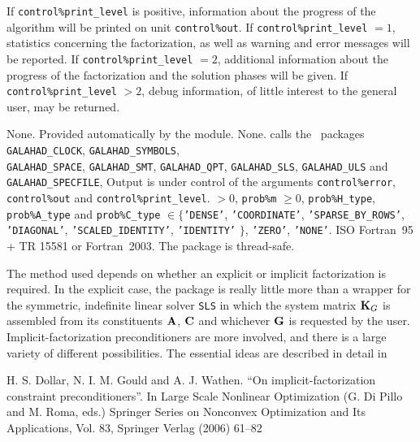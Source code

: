 \documentclass{galahad}
\newcommand{\packagename}{SBLS}
\begin{document}

\galinfo
If {\tt control\%print\_level} is positive, information about the progress
of the algorithm will be printed on unit {\tt control\-\%out}.
If {\tt control\%print\_level} $= 1$, statistics concerning the factorization,
as well as warning and error messages will be reported.
If {\tt control\%print\_level} $= 2$, additional information about the
progress of the factorization and the solution phases will be given.
If {\tt control\%print\_level} $> 2$, debug information, of little
interest to the general user, may be returned.


\galgeneral

\galcommon None.
\galworkspace Provided automatically by the module.
\galroutines None.
\galmodules {\tt \packagename\_solve} calls the \galahad\ packages
{\tt GALAHAD\_CLOCK},
{\tt GALAHAD\_SY\-M\-BOLS}, \\
{\tt GALAHAD\-\_SPACE},
{\tt GALAHAD\_SMT},
{\tt GALAHAD\_QPT},
{\tt GALAHAD\_SLS},
{\tt GALAHAD\_ULS} and
{\tt GALAHAD\_SPECFILE},
\galio Output is under control of the arguments
 {\tt control\%error}, {\tt control\%out} and {\tt control\%print\_level}.
 $> 0$, {\tt prob\%m} $\geq  0$,
{\tt prob\%H\_type}, {\tt prob\%A\_type}
and {\tt prob\%C\_type} $\in \{${\tt 'DENSE'},
 {\tt 'COORDINATE'}, {\tt 'SPARSE\_BY\_ROWS'}, {\tt 'DIAGONAL'},
 {\tt 'SCALED\_IDENTITY'}, {\tt 'IDENTITY'} $\}$,
 {\tt 'ZERO'}, {\tt 'NONE'}.
\galportability ISO Fortran~95 + TR 15581 or Fortran~2003.
The package is thread-safe.


\galmethod
The method used depends on whether an explicit or implicit
factorization is required. In the explicit case, the
package is really little more than a wrapper for the
symmetric, indefinite linear solver {\tt SLS} in
which the system matrix ${\mathbf{K}}_G$ is assembled from its constituents
${\mathbf{A}}$, ${\mathbf{C}}$ and whichever ${\mathbf{G}}$ is requested by the user.
Implicit-factorization preconditioners are more involved,
and there is a large variety of different possibilities. The
essential ideas are described in detail in
\vspace*{1mm}

\noindent
H. S. Dollar, N. I. M. Gould and A. J. Wathen.
``On implicit-factorization constraint preconditioners''.
In  Large Scale Nonlinear Optimization (G. Di Pillo and M. Roma, eds.)
Springer Series on Nonconvex Optimization and Its Applications, Vol. 83,
Springer Verlag (2006) 61--82
\end{document}
